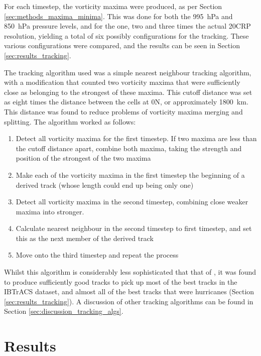 \documentclass[pdftex,12pt,a4paper]{report}
\begin{document}
For each timestep, the vorticity maxima were produced, as per Section \ref{sec:methods_maxima_minima}. This was done for both the \SI{995}{hPa} and \SI{850}{hPa} pressure levels, and for the one, two and three times the actual 20CRP resolution, yielding a total of six possibly configurations for the tracking. These various configurations were compared, and the results can be seen in Section \ref{sec:results_tracking}.

The tracking algorithm used was a simple nearest neighbour tracking algorithm, with a modification that counted two vorticity maxima that were sufficiently close as belonging to the strongest of these maxima. This cutoff distance was set as eight times the distance between the cells at 0\textdegree N, or approximately \SI{1800}{km}. This distance was found to reduce problems of vorticity maxima merging and splitting. The algorithm worked as follows:

\begin{enumerate}
    \item Detect all vorticity maxima for the first timestep. If two maxima are less than the cutoff distance apart, combine both maxima, taking the strength and position of the strongest of the two maxima
    \item Make each of the vorticity maxima in the first timestep the beginning of a derived track (whose length could end up being only one)
    \item Detect all vorticity maxima in the second timestep, combining close weaker maxima into stronger.
    \item Calculate nearest neighbour in the second timestep to first timestep, and set this as the next member of the derived track
    \item Move onto the third timestep and repeat the process
\end{enumerate}

Whilst this algorithm is considerably less sophisticated that that of \textcite{hodges1994}, it was found to produce sufficiently good tracks to pick up most of the best tracks in the IBTrACS dataset, and almost all of the best tracks that were hurricanes (Section  \ref{sec:results_tracking}). A discussion of other tracking algorithms can be found in Section \ref{sec:discussion_tracking_algs}.

\chapter{Results}
\end{document}

